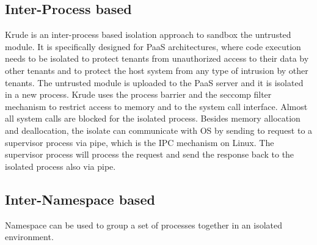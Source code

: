 \subsection{Inter-Process based}

Krude \etal \cite{Krude} is an inter-process based isolation approach to sandbox
the untrusted module. It is specifically designed for PaaS architectures, where
code execution needs to be isolated to protect tenants from unauthorized access
to their data by other tenants and to protect the host system from any type of
intrusion by other tenants. The untrusted module is uploaded to the PaaS server
and it is isolated in a new process. Krude \etal uses the process barrier and
the seccomp filter mechanism to restrict access to memory and to the system call
interface. Almost all system calls are blocked for the isolated process. Besides
memory allocation and deallocation, the isolate can communicate with OS by
sending to request to a supervisor process via pipe, which is the IPC mechanism
on Linux. The supervisor process will process the request and send the response
back to the isolated process also via pipe.

\subsection{Inter-Namespace based}

Namespace can be used to group a set of processes together in an isolated
environment. 

